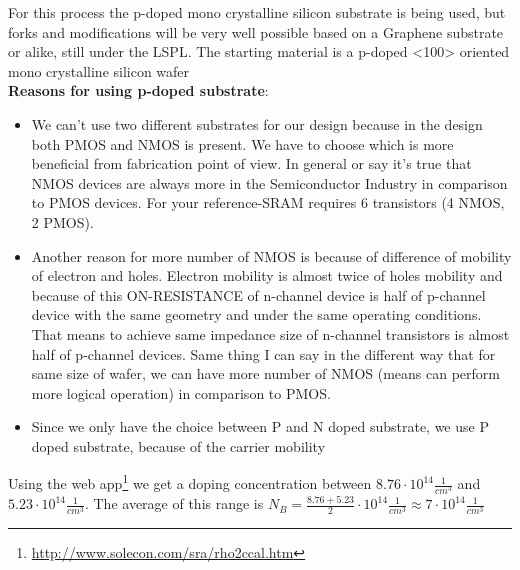 For this process the p-doped mono crystalline silicon substrate is being used, but forks and modifications will be very well possible based on a Graphene substrate or alike, still under the LSPL.
The starting material is a p-doped <100> oriented mono crystalline silicon wafer\\

\textbf{Reasons for using p-doped substrate}:\begin{itemize}
\item We can't use two different substrates for our design because in the design both PMOS and NMOS is present.
We have to choose which is more beneficial from fabrication point of view.
In general or say it's true that NMOS devices are always more in the Semiconductor Industry in comparison to PMOS devices.
For your reference-SRAM requires 6 transistors (4 NMOS, 2 PMOS).
\item Another reason for more number of NMOS is because of difference of mobility of electron and holes.
Electron mobility is almost twice of holes mobility and because of this ON-RESISTANCE of n-channel device is half of p-channel device with the same geometry and under the same operating conditions.
That means to achieve same impedance size of n-channel transistors is almost half of p-channel devices.
Same thing I can say in the different way that for same size of wafer, we can have more number of NMOS (means can perform more logical operation) in comparison to PMOS.
\item Since we only have the choice between P and N doped substrate, we use P doped substrate, because of the carrier mobility
\end{itemize}

Using the web app\footnote{\url{http://www.solecon.com/sra/rho2ccal.htm}} we get a doping concentration between $8.76 \cdot 10^{14} \frac{1}{cm^3}$ and $5.23 \cdot 10^{14} \frac{1}{cm^3}$.
The average of this range is $N_B = \frac{8.76+5.23 }{2} \cdot 10^{14} \frac{1}{cm^3} \approx 7 \cdot 10^{14} \frac{1}{cm^3}$